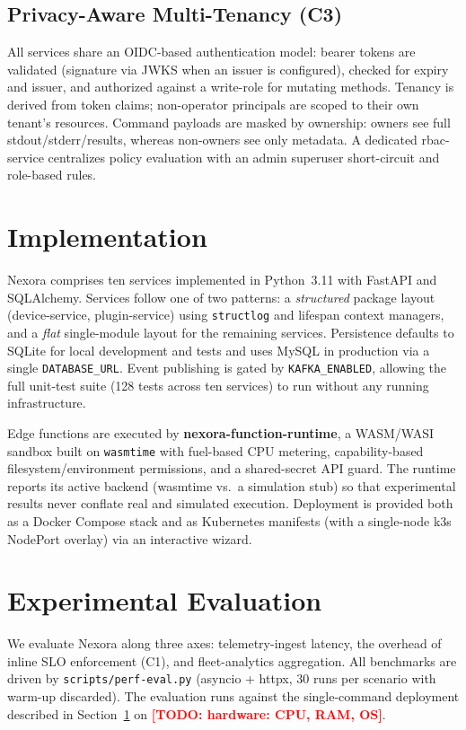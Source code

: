 \documentclass[review,12pt]{elsarticle}
\newcommand{\TODO}[1]{\textcolor{red}{\textbf{[TODO: #1]}}}
\begin{document}
\subsection{Privacy-Aware Multi-Tenancy (C3)}
\label{sec:tenancy}
All services share an OIDC-based authentication model: bearer tokens are
validated (signature via JWKS when an issuer is configured), checked for
expiry and issuer, and authorized against a write-role for mutating methods.
Tenancy is derived from token claims; non-operator principals are scoped to
their own tenant's resources. Command payloads are masked by ownership: owners
see full \textsf{stdout}/\textsf{stderr}/results, whereas non-owners see only
metadata. A dedicated rbac-service centralizes policy evaluation with an
admin superuser short-circuit and role-based rules.

\section{Implementation}
\label{sec:impl}
Nexora comprises ten services implemented in Python~3.11 with FastAPI and
SQLAlchemy. Services follow one of two patterns: a \emph{structured} package
layout (device-service, plugin-service) using \texttt{structlog} and lifespan
context managers, and a \emph{flat} single-module layout for the remaining
services. Persistence defaults to SQLite for local development and tests and
uses MySQL in production via a single \texttt{DATABASE\_URL}. Event publishing
is gated by \texttt{KAFKA\_ENABLED}, allowing the full unit-test suite
(128 tests across ten services) to run without any running infrastructure.

Edge functions are executed by \textbf{nexora-function-runtime}, a WASM/WASI
sandbox built on \texttt{wasmtime} with fuel-based CPU metering, capability-based
filesystem/environment permissions, and a shared-secret API guard. The runtime
reports its active backend (\textsf{wasmtime} vs.\ a simulation stub) so that
experimental results never conflate real and simulated execution. Deployment is
provided both as a Docker Compose stack and as Kubernetes manifests (with a
single-node k3s NodePort overlay) via an interactive wizard.

\section{Experimental Evaluation}
\label{sec:eval}
We evaluate Nexora along three axes: telemetry-ingest latency, the overhead of
inline SLO enforcement (C1), and fleet-analytics aggregation. All benchmarks are
driven by \texttt{scripts/perf-eval.py} (asyncio + httpx, 30 runs per scenario
with warm-up discarded). The evaluation runs against the single-command
deployment described in Section~\ref{sec:impl} on
\TODO{hardware: CPU, RAM, OS}.
\end{document}
